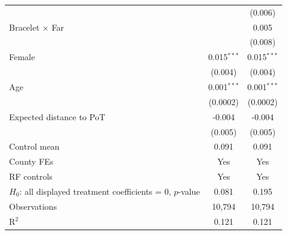 {\begin{tabular}{lcc}
                                                              &               & (0.006)\\   
   Bracelet $\times$ Far                                      &               & 0.005\\   
                                                              &               & (0.008)\\   
   \addlinespace[0.4em]
   Female                                                     & 0.015$^{***}$ & 0.015$^{***}$\\   
                                                              & (0.004)       & (0.004)\\   
   Age                                                        & 0.001$^{***}$ & 0.001$^{***}$\\   
                                                              & (0.0002)      & (0.0002)\\   
   Expected distance to PoT                                   & -0.004        & -0.004\\   
                                                              & (0.005)       & (0.005)\\   
   Control mean                                               & 0.091         & 0.091\\  
   County FEs                                                 & Yes           & Yes\\  
   RF controls                                                & Yes           & Yes\\  
   $H_0$: all displayed treatment coefficients = 0, $p$-value & 0.081         & 0.195\\  
   \midrule
   Observations                                               & 10,794        & 10,794\\  
   R$^2$                                                      & 0.121         & 0.121\\  
   \midrule \midrule
\end{tabular}}



